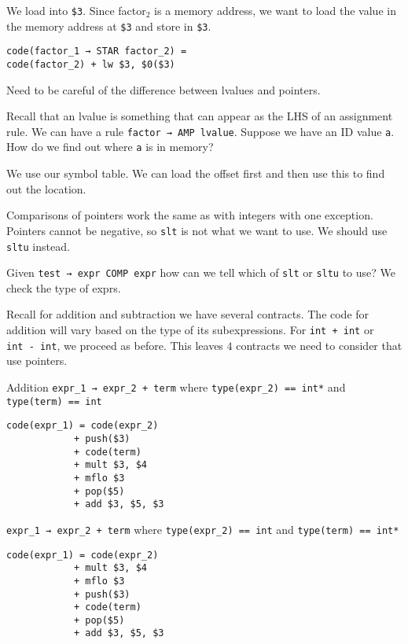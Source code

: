 \documentclass{article}
\begin{document}
We load into \texttt{\$3}. Since factor\(_2\) is a memory address, we
want to load the value in the memory address at \texttt{\$3} and store
in \texttt{\$3}.

\begin{tcolorbox}
\begin{verbatim}
code(factor_1 → STAR factor_2) =
code(factor_2) + lw $3, $0($3)
\end{verbatim}
\end{tcolorbox}

Need to be careful of the difference between lvalues and pointers.

Recall that an lvalue is something that can appear as the LHS of an
assignment rule. We can have a rule \texttt{factor\ →\ AMP\ lvalue}.
Suppose we have an ID value \texttt{a}. How do we find out where
\texttt{a} is in memory?

We use our symbol table. We can load the offset first and then use this
to find out the location.

Comparisons of pointers work the same as with integers with one
exception. Pointers cannot be negative, so \texttt{slt} is not what we
want to use. We should use \texttt{sltu} instead.

Given \texttt{test\ →\ expr\ COMP\ expr} how can we tell which of
\texttt{slt} or \texttt{sltu} to use? We check the type of exprs.

Recall for addition and subtraction we have several contracts. The code
for addition will vary based on the type of its subexpressions. For
\texttt{int\ +\ int} or \texttt{int\ -\ int}, we proceed as before. This
leaves \(4\) contracts we need to consider that use pointers.

Addition \texttt{expr\_1\ →\ expr\_2\ +\ term} where
\texttt{type(expr\_2)\ ==\ int*} and \texttt{type(term)\ ==\ int}

\begin{tcolorbox}
\begin{verbatim}
code(expr_1) = code(expr_2)
            + push($3)
            + code(term)
            + mult $3, $4
            + mflo $3
            + pop($5)
            + add $3, $5, $3
\end{verbatim}
\end{tcolorbox}

\texttt{expr\_1\ →\ expr\_2\ +\ term} where
\texttt{type(expr\_2)\ ==\ int} and \texttt{type(term)\ ==\ int*}

\begin{tcolorbox}
\begin{verbatim}
code(expr_1) = code(expr_2)
            + mult $3, $4
            + mflo $3
            + push($3)
            + code(term)
            + pop($5)
            + add $3, $5, $3
\end{verbatim}
\end{tcolorbox}
\end{document}
